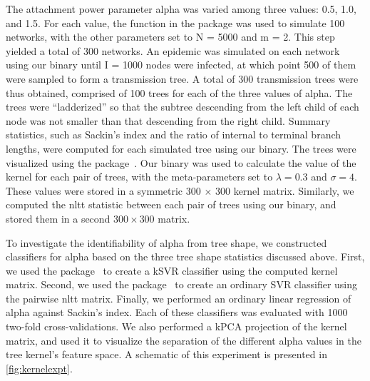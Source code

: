 The attachment power parameter \gls{alpha} was varied among three values: 0.5,
1.0, and 1.5. For each value, the  function in the
 package was used to simulate 100 networks, with the other
parameters set to \gls{N} = 5000 and \gls{m} = 2. This step yielded a total of
300 networks. An epidemic was simulated on each network using our
 binary until \gls{I} = 1000 nodes were infected, at which
point 500 of them were sampled to form a transmission tree. A total of 300
transmission trees were thus obtained, comprised of 100 trees for each of the
three values of \gls{alpha}. The trees were ``ladderized'' so that the subtree
descending from the left child of each node was not smaller than that
descending from the right child. Summary statistics, such as Sackin's index and
the ratio of internal to terminal branch lengths, were computed for each
simulated tree using our  binary. The trees were visualized
using the  package~\autocite{paradis2004ape}. 
Our  binary was used to calculate the value of the kernel
for each pair of trees, with the meta-parameters set to $\lambda = 0.3$ and
$\sigma = 4$. These values were stored in a symmetric 300 $\times$ 300 kernel
matrix.  Similarly, we computed the \gls{nltt} statistic between each pair of
trees using our  binary, and stored them in a second $300
\times 300$ matrix.

To investigate the identifiability of \gls{alpha} from tree shape, we
constructed classifiers for \gls{alpha} based on the three tree shape
statistics discussed above. First, we used the 
package~\autocite{zeileis2004kernlab} to create a \gls{kSVR} classifier using
the computed kernel matrix. Second, we used the 
package~\autocite{meyer2015e1071} to create an ordinary \gls{SVR} classifier
using the pairwise \gls{nltt} matrix. Finally, we performed an ordinary linear
regression of \gls{alpha} against Sackin's index. Each of these classifiers was
evaluated with 1000 two-fold cross-validations. We also performed a \gls{kPCA}
projection of the kernel matrix, and used it to visualize the separation of the
different \gls{alpha} values in the tree kernel's feature space. A schematic of
this experiment is presented in \cref{fig:kernelexpt}.

